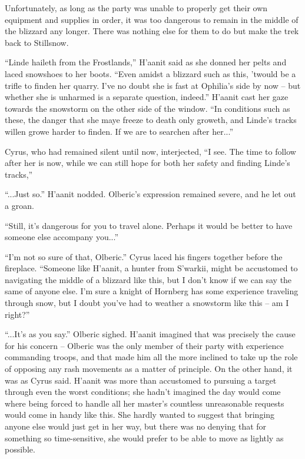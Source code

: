 Unfortunately, as long as the party was unable to properly get their own equipment and supplies in order, it was too dangerous to remain in the middle of the blizzard any longer. There was nothing else for them to do but make the trek back to Stillsnow.

``Linde haileth from the Frostlands,'' H'aanit said as she donned her pelts and laced snowshoes to her boots. ``Even amidst a blizzard such as this, 'twould be a trifle to finden her quarry. I've no doubt she is fast at Ophilia's side by now -- but whether she is unharmed is a separate question, indeed.'' H'aanit cast her gaze towards the snowstorm on the other side of the window. ``In conditions such as these, the danger that she maye freeze to death only groweth, and Linde's tracks willen growe harder to finden. If we are to searchen after her...''

Cyrus, who had remained silent until now, interjected, ``I see. The time to follow after her is now, while we can still hope for both her safety and finding Linde's tracks,''

``...Just so.'' H'aanit nodded. Olberic's expression remained severe, and he let out a groan.

``Still, it's dangerous for you to travel alone. Perhaps it would be better to have someone else accompany you...''

``I'm not so sure of that, Olberic.'' Cyrus laced his fingers together before the fireplace. ``Someone like H'aanit, a hunter from S'warkii, might be accustomed to navigating the middle of a blizzard like this, but I don't know if we can say the same of anyone else. I'm sure a knight of Hornberg has some experience traveling through snow, but I doubt you've had to weather a snowstorm like this -- am I right?''

``...It's as you say.'' Olberic sighed. H'aanit imagined that was precisely the cause for his concern -- Olberic was the only member of their party with experience commanding troops, and that made him all the more inclined to take up the role of opposing any rash movements as a matter of principle.  On the other hand, it was as Cyrus said. H'aanit was more than accustomed to pursuing a target through even the worst conditions; she hadn't imagined the day would come where being forced to handle all her master's countless unreasonable requests would come in handy like this. She hardly wanted to suggest that bringing anyone else would just get in her way, but there was no denying that for something so time-sensitive, she would prefer to be able to move as lightly as possible.


